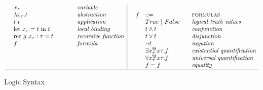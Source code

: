 \begin{figure}[H]
\begin{adjustwidth}{-7em}{-3em}
\begin{displaymath}
\begin{array}{ll@{\hspace*{-0.1cm}}
							 l@{\hspace*{1.5cm} }
							 l|@{\hspace*{0.5cm}}
							 llll}
	& \lgvar{x}{\tau}
	& & \textit{variable}
	
	& \ \\


	
	& \lgabs{x}{\tau}{t}
	& & \textit{abstraction}  &

  f & ::= 
	& & \textsc{formulas} \\

	
	
	& \lgapp{t}{t}
	& & \textit{application} &
	
	& True ~|~ False 
	& & \textit{logical truth values} \\
	
	
	
	& \lglet{x}{\tau}{t}{t}
	& & \textit{local binding} &
	
	& \lgand{t}{t} 
	& & \textit{conjunction}\\
	
	
	
	& \lgrec{g}{\tau}{x}{\tau}{t}
	& & \textit{recursive function} &
	
	& \lgor{t}{t} 
	& & \textit{disjunction} \\
	
		
		
	& f
	& & \textit{formula} &
	
	& \neg t
	& & \textit{negation} \\		



	& \ 
	& & \ &
	
	&  \lgexist{x}{\tau}{f} 
	& & \textit{existential quantification} \\ 



	& \ 
	& & \ &
	
	&  \lgforall{x}{\tau}{f} 
	& & \textit{universal quantification} \\ 
	
	
	
	& \ 
	& & \ &
	
	&  f = f
	& & \textit{equality} \\ 

	\hline			   
  	\end{array} 
		\end{displaymath} 
 		\caption{Logic Syntax}
 		\end{adjustwidth}
	\end{figure}
 